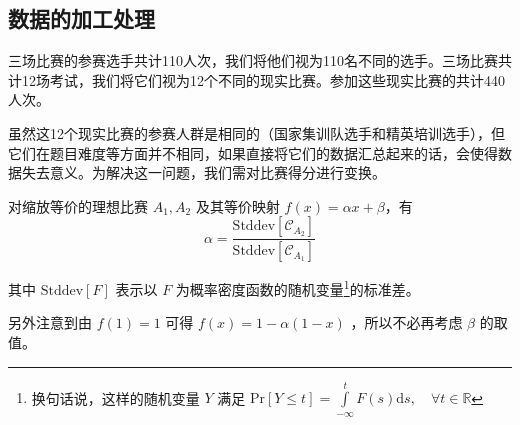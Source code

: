     \subsection{数据的加工处理}\label{sec:dataPreprocessingOfCTT}

        三场比赛的参赛选手共计110人次，我们将他们视为110名不同的选手。三场比赛共计12场考试，我们将它们视为12个不同的现实比赛。参加这些现实比赛的共计440人次。
        
        虽然这12个现实比赛的参赛人群是相同的（国家集训队选手和精英培训选手），但它们在题目难度等方面并不相同，如果直接将它们的数据汇总起来的话，会使得数据失去意义。为解决这一问题，我们需对比赛得分进行变换。

        \begin{proposition}
            对缩放等价的理想比赛 $A_1,A_2$ 及其等价映射 $f(x)=\alpha x+\beta$\nobreak，有
            $$
            \alpha=\frac{\mathrm{Stddev}\left[\mathcal{C}_{A_2}\right]}{\mathrm{Stddev}\left[\mathcal{C}_{A_1}\right]}
            $$

            其中 $\mathrm{Stddev}\left[F\right]$ 表示以 $F$ 为概率密度函数的随机变量\footnote{换句话说，这样的随机变量 $Y$ 满足 $\mathrm{Pr}\left[Y\leq t\right]=\int\limits_{-\infty}^t F(s)\mathrm{d}s,\quad\forall t\in\mathbb{R}$}的标准差。

            另外注意到由 $f(1)=1$ 可得 $f(x)=1-\alpha(1-x)$ ，所以不必再考虑 $\beta$ 的取值。
            \label{prop:alphaAsQuotientOfStddev}
        \end{proposition}

